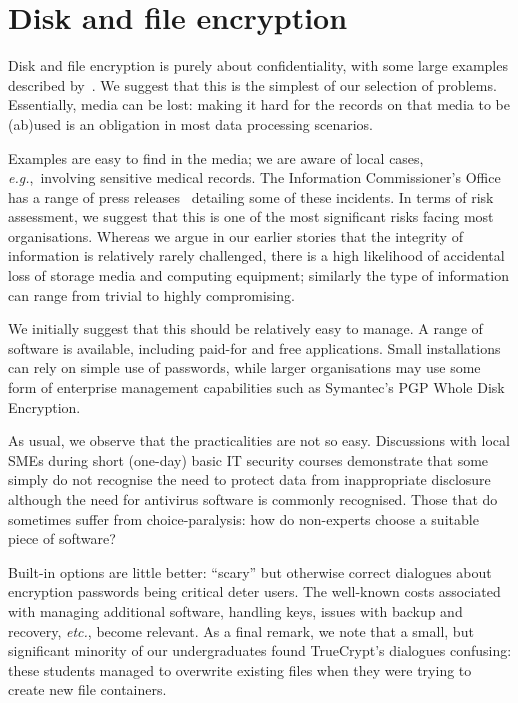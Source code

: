 \documentclass{article}
\def\citeN{\citet}
\def\cite{\citep}
\newcommand{\eg}{\textit{e.g.}}
\newcommand{\etc}{\textit{etc.}}
\newenvironment{userstories}{\begin{description}}{\end{description}}
\begin{document}
\section{Disk and file encryption}\label{sec:dfe}

\begin{userstories}
\USAdata
\end{userstories}

Disk and file encryption is purely about confidentiality, with some
large examples described by~\citeN{mSecurosis1}.  We suggest that this is the
simplest of our selection of problems. Essentially, media can be
lost: making it hard for the records on that media to be (ab)used
is an obligation in most data processing scenarios.

Examples are easy to find in the media; we are aware of local
cases, \eg,~involving sensitive medical records.  The Information
Commissioner's Office has a range of press
releases~\cite{mICO} detailing some of these incidents.  In
terms of risk assessment, we suggest that this is one of the most significant
risks facing most organisations.  Whereas we argue in our earlier
stories that the integrity of information is relatively rarely
challenged, there is a high likelihood of accidental loss of storage media and computing
equipment; similarly the type of
information can range from trivial to highly compromising.

We initially suggest that this should be relatively easy to manage.
A range of software is available, including paid-for and free applications.
Small installations can rely on simple use of passwords, while larger
organisations may use some form of enterprise management capabilities
such as Symantec's PGP Whole Disk Encryption.

As usual, we observe that the practicalities are not so easy.
Discussions with local SMEs during short (one-day) basic IT security courses demonstrate that some simply do not
recognise the need to protect data from inappropriate disclosure although the need for antivirus software is
commonly recognised.  Those that do sometimes suffer from choice-paralysis: how
do non-experts choose a suitable piece of software?  

Built-in options are little better: ``scary'' but otherwise correct dialogues
about encryption passwords being critical deter users.  The
well-known costs associated with managing additional software,
handling keys, issues with backup and recovery, \etc, become relevant.  As a
final remark, we note that a small, but significant minority of our
undergraduates found TrueCrypt's dialogues confusing: these students
managed to overwrite existing files when they were trying to create
new file containers.
\end{document}
